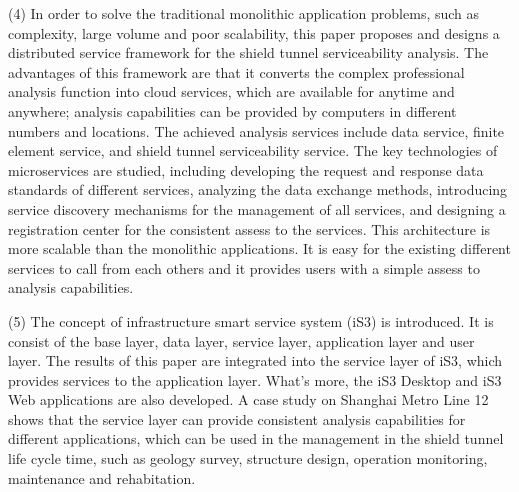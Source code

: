 \begin{eabstract}
(4) In order to solve the traditional monolithic application problems, such as complexity, large volume and poor scalability, this paper proposes and designs a distributed service framework for the shield tunnel serviceability analysis. The advantages of this framework are that it converts the complex professional analysis function into cloud services, which are available for anytime and anywhere; analysis capabilities can be provided by computers in different numbers and locations. The achieved analysis services include data service, finite element service, and shield tunnel serviceability service. The key technologies of microservices are studied, including developing the request and response data standards of different services, analyzing the data exchange methods, introducing service discovery mechanisms for the management of all services, and designing a registration center for the consistent assess to the services. This architecture is more scalable than the monolithic applications. It is easy for the existing different services to call from each others and it provides users with a simple assess to analysis capabilities.

(5) The concept of infrastructure smart service system (iS3) is introduced. It is consist of the base layer, data layer, service layer, application layer and user layer. The results of this paper are integrated into the service layer of iS3, which provides services to the application layer. What's more, the iS3 Desktop and iS3 Web applications are also developed. A case study on Shanghai Metro Line 12 shows that the service layer can provide consistent analysis capabilities for different applications, which can be used in the management in the shield tunnel life cycle time, such as geology survey, structure design, operation monitoring, maintenance and rehabitation.

\end{eabstract}

